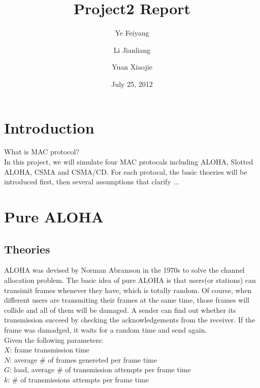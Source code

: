 \documentclass[11pt,oneside,a4paper]{report}
\begin{document}
\title{Project2 Report}

\author{Ye Feiyang \and Li Jianliang \and Yuan Xiaojie}

\date{July 25, 2012}

\maketitle

\section*{Introduction}

What is MAC protocol?\\
In this project, we will simulate four MAC protocals including ALOHA, Slotted ALOHA, CSMA and CSMA/CD. For each protocal, the basic thoeries will be introduced first, then several assumptions that clarify ...

\section*{Pure ALOHA}

\subsection*{Theories}

ALOHA was devised by Norman Abramson in the 1970s to solve the channel allocation problem. The basic idea of pure ALOHA is that users(or stations) can transimit frames whenever they have, which is totally random. Of course, when different users are transmiting their frames at the same time, those frames will collide and all of them will be damaged. A sender can find out whether its transmission succeed by checking the acknowledgements from the receiver. If the frame was damadged, it waits for a random time and send again. \\

Given the following parameters: \\

\qquad	\(X\): frame transmission time \\

\qquad	\(N\): average \# of frames genereted per frame time \\

\qquad	\(G\): load, average \# of transmission attempts per frame time \\

\qquad	\(k\): \# of transmissions attempts per frame time \\
\end{document}
